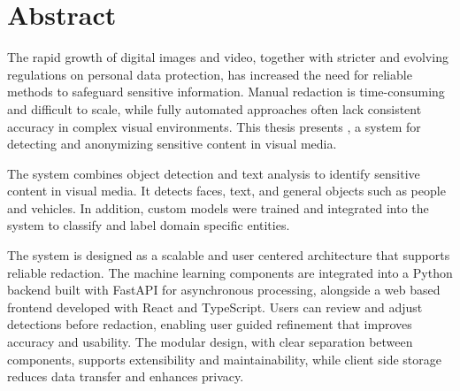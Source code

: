 \chapter*{Abstract}

The rapid growth of digital images and video, together with stricter and evolving regulations on personal data protection, has increased the need for reliable methods to safeguard sensitive information. Manual redaction is time-consuming and difficult to scale, while fully automated approaches often lack consistent accuracy in complex visual environments. This thesis presents , a system for detecting and anonymizing sensitive content in visual media. 

The system combines \gls{object detection} and text analysis to identify sensitive content in visual media. It detects faces, text, and general objects such as people and vehicles. In addition, custom models were trained and integrated into the system to classify and label domain specific entities. 

The system is designed as a scalable and user centered architecture that supports reliable redaction. The machine learning components are integrated into a Python backend built with FastAPI for asynchronous processing, alongside a web based frontend developed with React and TypeScript. Users can review and adjust detections before redaction, enabling user guided refinement that improves accuracy and usability. The modular design, with clear separation between components, supports extensibility and maintainability, while client side storage reduces data transfer and enhances privacy.